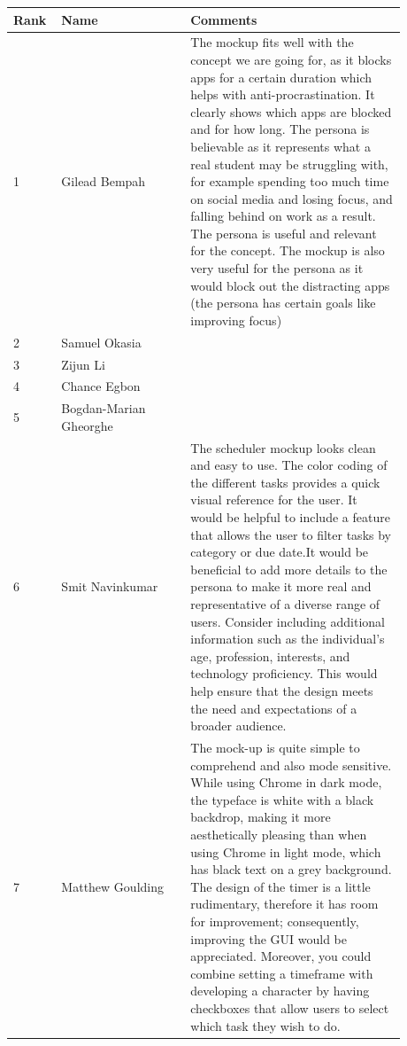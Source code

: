 \documentclass[a4paper]{article}
\begin{document}
{\noindent\begin{tabular}{|p{0.075\linewidth}|p{0.3\linewidth}|p{0.5\linewidth}|} 
	\hline
 \textbf{Rank} & \textbf{Name} & \textbf{Comments} \\
 \hline
 1 & Gilead Bempah						& The mockup fits well with the concept we are going for, as it blocks apps for a certain duration which helps with anti-procrastination. It clearly shows which apps are blocked and for how long. The persona is believable as it represents what a real student may be struggling with, for example spending too much time on social media and losing focus, and falling behind on work as a result. The persona is useful and relevant for the concept. The mockup is also very useful for the persona as it would block out the distracting apps (the persona has certain goals like improving focus)\\
 \hline
 2 & Samuel Okasia							& \\
 \hline
 3 & Zijun Li									& \\
 \hline
 4 & Chance Egbon								& \\
 \hline
 5 & Bogdan-Marian Gheorghe					& \\
 \hline
 6 & Smit Navinkumar							& The scheduler mockup looks clean and easy to use. The color coding of the different tasks provides a quick visual reference for the user. It would be helpful to include a feature that allows the user to filter tasks by category or due date.It would be beneficial to add more details to the persona to make it more real and representative of a diverse range of users. Consider including additional information such as the individual's age, profession, interests, and technology proficiency. This would help ensure that the design meets the need and expectations of a broader audience.\\
 \hline
 7 & Matthew Goulding							& The mock-up is quite simple to comprehend and also mode sensitive. While using Chrome in dark mode, the typeface is white with a black backdrop, making it more aesthetically pleasing than when using Chrome in light mode, which has black text on a grey background. The design of the timer is a little rudimentary, therefore it has room for improvement; consequently, improving the GUI would be appreciated. Moreover, you could combine setting a timeframe with developing a character by having checkboxes that allow users to select which task they wish to do.\\
 \hline
\end{tabular}

}
\end{document}
